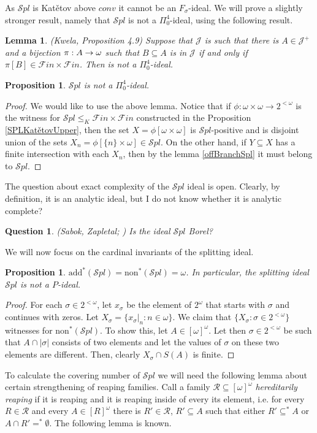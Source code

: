 \documentclass[a4paper]{amsart}
\newtheorem{lemma}[theorem]{Lemma}
\newtheorem{proposition}[theorem]{Proposition}
\newtheorem{question}[theorem]{Question}
\newcommand{\Cantor}{2^{\omega}}
\newcommand{\cantor}{2^{<\omega}}
\newcommand{\add}{\mathrm{add}}
\newcommand{\non}{\mathrm{non}}
\newcommand{\J}{\mathcal{J}}
\newcommand{\FF}{\mathcal{F}in\times\mathcal{F}in}
\newcommand{\SPL}{\mathcal{S}pl}
\newcommand{\conv}{conv}
\begin{document}
As $\SPL$ is Katětov above $\conv$ it cannot be an $F_{\sigma}$-ideal. We will prove a slightly stronger result, namely that $\SPL$ is not a $\Pi_{0}^{4}$-ideal, using the following result.
\begin{lemma}(Kwela, \cite{KwelaUnboring} Proposition 4.9)
    Suppose that $\J$ is such that there is $A\in\J^{+}$ and a bijection $\pi:A\rightarrow\omega\time\omega$ such that $B\subseteq A$ is in $\J$ if and only if $\pi[B]\in\FF$. Then is not a $\Pi_{0}^{4}$-ideal.
\end{lemma}
\begin{proposition}
    $\SPL$ is not a $\Pi_{0}^{4}$-ideal.
\end{proposition}
\begin{proof}   
    We would like to use the above lemma. Notice that if $\phi:\omega\times\omega\rightarrow\cantor$ is the witness for $\SPL\leq_{K}\FF$ constructed in the Proposition \ref{SPLKatětovUpper}, then the set $X=\phi[\omega\times\omega]$ is $\SPL$-positive and is disjoint union of the sets $X_{n}=\phi[\{n\}\times\omega]\in\SPL$. On the other hand, if $Y\subseteq X$ has a finite intersection with each $X_{n}$, then by the lemma \ref{offBranchSpl} it must belong to $\SPL$.
\end{proof}
The question about exact complexity of the $\SPL$ ideal is open. Clearly, by definition, it is an analytic ideal, but I do not know whether it is analytic complete?
\begin{question}(Sabok, Zapletal; \cite{SabZapl})
    Is the ideal $\SPL$ Borel?
\end{question}
We will now focus on the cardinal invariants of the splitting ideal.
\begin{proposition}
    $\add^{*}(\SPL)=\non^{*}(\SPL)=\omega$. In particular, the splitting ideal $\SPL$ is not a $P$-ideal.
\end{proposition}
\begin{proof}
    For each $\sigma\in \cantor$, let $x_{\sigma}$ be the element of $\Cantor$ that starts with $\sigma$ and continues with zeros. Let $X_{\sigma}=\{x_{\sigma}|_{n}:n\in\omega\}$. We claim that $\{X_{\sigma}:\sigma\in \cantor\}$ witnesses for $\non^{*}(\SPL)$. To show this, let $A\in[\omega]^{\omega}$. Let then $\sigma\in \cantor$ be such that $A\cap|\sigma|$ consists of two elements and let the values of $\sigma$ on these two elements are different. Then, clearly $X_{\sigma}\cap S(A)$ is finite.
\end{proof}
To calculate the covering number of $\SPL$ we will need the following lemma about certain strengthening of reaping families. Call a family $\mathcal{R}\subseteq[\omega]^{\omega}$ \emph{hereditarily reaping} if it is reaping and it is reaping inside of every its element, i.e. for every $R\in\mathcal{R}$ and every $A\in[R]^{\omega}$ there is $R'\in\mathcal{R}$, $R'\subseteq A$ such that either $R'\subseteq^{*} A$ or $A\cap R'=^{*}\emptyset$. The following lemma is known.
\end{document}
